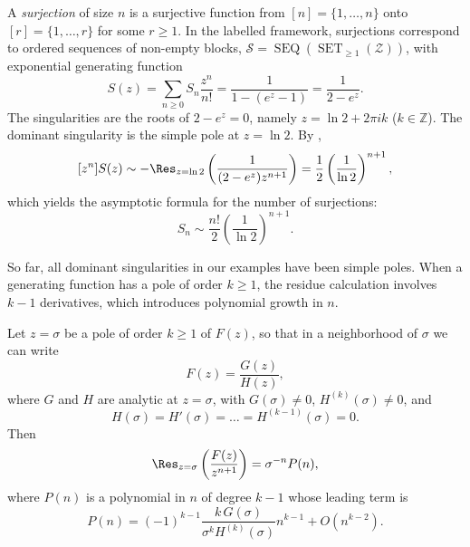 \begin{example}
    \label{ex:surjections}
    A \emph{surjection} of size \(n\) is a surjective function from \([n] = \{1, \dots, n\}\) onto \([r] = \{1, \dots, r\}\) for some \(r \ge 1\).
    In the labelled framework, surjections correspond to ordered sequences of non-empty blocks, \(\mathcal{S} = \operatorname{SEQ}(\operatorname{SET}_{\ge 1}(\mathcal{Z}))\), with exponential generating function
    \[
        S(z) = \sum_{n \ge 0} S_n \frac{z^n}{n!} = \frac{1}{1 - (e^z - 1)} = \frac{1}{2 - e^z}.
    \]
    The singularities are the roots of \(2 - e^z = 0\), namely \(z = \ln 2 + 2\pi i k\) (\(k \in \mathbb{Z}\)).
    The dominant singularity is the simple pole at \(z = \ln 2\).
    By ,
    \[
        [z^n] S(z) \sim - \Res_{z = \ln 2} \left( \frac{1}{(2 - e^z) z^{n+1}} \right) = \frac{1}{2}\left( \frac{1}{\ln 2} \right)^{n+1},
    \]
    which yields the asymptotic formula for the number of surjections:
    \[
        S_n \sim \frac{n!}{2} \left( \frac{1}{\ln 2} \right)^{n+1}.
    \]
\end{example}

So far, all dominant singularities in our examples have been simple poles.
When a generating function has a pole of order \(k \ge 1\), the residue calculation involves \(k-1\) derivatives, which introduces polynomial growth in \(n\).

\begin{lemma}
    \label{lem:higher-order-pole}
    Let \(z = \sigma\) be a pole of order \(k \ge 1\) of \(F(z)\), so that in a neighborhood of \(\sigma\) we can write
    \[
        F(z) = \frac{G(z)}{H(z)},
    \]
    where \(G\) and \(H\) are analytic at \(z = \sigma\), with \(G(\sigma) \neq 0\), \(H^{(k)}(\sigma) \neq 0\), and
    \[
        H(\sigma) = H'(\sigma) = \dots = H^{(k-1)}(\sigma) = 0.
    \]
    Then
    \[
        \Res_{z = \sigma} \left( \frac{F(z)}{z^{n+1}} \right) = \sigma^{-n} P(n),
    \]
    where \(P(n)\) is a polynomial in \(n\) of degree \(k-1\) whose leading term is
    \[
        P(n) = (-1)^{k-1} \frac{k \, G(\sigma)}{\sigma^k H^{(k)}(\sigma)} n^{k-1} + O(n^{k-2}).
    \]
\end{lemma}

